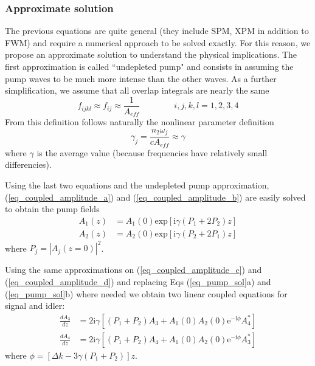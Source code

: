 \documentclass[12pt,a4paper,twoside]{article}
\begin{document}
\subsubsection{Approximate solution}
The previous equations are quite general (they include SPM, XPM in addition to FWM) and require a numerical approach to be solved exactly.
For this reason, we propose an approximate solution to understand the physical implications.
The first approximation is called ``undepleted pump" and consists in assuming the pump waves to be much more intense than the other waves.
As a further simplification, we assume that all overlap integrals are nearly the same
\begin{equation}
	f_{ijkl} \approx f_{ij} \approx \frac{1}{A_{eff}}	\qquad \qquad i,j,k,l = 1,2,3,4
	\label{eq_overlap_approx}
\end{equation}
From this definition follows naturally the nonlinear parameter definition
\begin{equation}
	\gamma_j = \frac{n_2\omega_j}{cA_{eff}} \approx \gamma
	\label{eq_gamma_approx}
\end{equation}
where $\gamma$ is the average value (because frequencies have relatively small differencies).

Using the last two equations and the undepleted pump approximation, (\ref{eq_coupled_amplitude_a}) and (\ref{eq_coupled_amplitude_b}) are easily solved to obtain the pump fields
\begin{subequations}
\begin{align}
	A_1(z) &= A_1(0)\mathrm{exp}[\mathrm{i}\gamma(P_1 + 2P_2)z] \\
	A_2(z) &= A_2(0)\mathrm{exp}[\mathrm{i}\gamma(P_2 + 2P_1)z]
\end{align}
	\label{eq_pump_sol}
\end{subequations}
where $P_j = |A_j(z=0)|^2$.

Using the same approximations on (\ref{eq_coupled_amplitude_c}) and (\ref{eq_coupled_amplitude_d}) and replacing Eqs (\ref{eq_pump_sol}a) and (\ref{eq_pump_sol}b) where needed we obtain two linear coupled equations for signal and idler:
\begin{subequations}
\begin{align}
	\frac{dA_3}{dz} &= 2\mathrm{i}\gamma [(P_1 + P_2)A_3 + A_1(0)A_2(0)\mathrm{e}^{-\mathrm{i}\phi}A_4^*]
	\label{eq_sig}\\
	\frac{dA_4}{dz} &= 2\mathrm{i}\gamma [(P_1 + P_2)A_4 + A_1(0)A_2(0)\mathrm{e}^{-\mathrm{i}\phi}A_3^*]
	\label{eq_idl}
\end{align}
\end{subequations}
where $\phi = [\Delta k - 3\gamma(P_1 + P_2)]z$.
\end{document}
